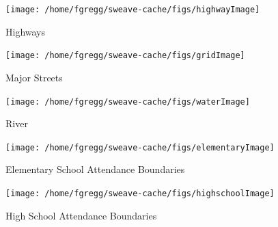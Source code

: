 \documentclass[12pt,letter]{article}\usepackage[]{graphicx}\usepackage[]{color}
\newenvironment{knitrout}{}{} %
\begin{document}
\begin{figure}
\begin{knitrout}
\color{fgcolor}

{\centering \texttt{[image: /home/fgregg/sweave-cache/figs/highwayImage]} 

}



\end{knitrout}

\caption{Highways}
\end{figure}

\begin{figure}
\begin{knitrout}
\color{fgcolor}

{\centering \texttt{[image: /home/fgregg/sweave-cache/figs/gridImage]} 

}



\end{knitrout}

\caption{Major Streets}
\end{figure}

\begin{figure}
\begin{knitrout}
\color{fgcolor}

{\centering \texttt{[image: /home/fgregg/sweave-cache/figs/waterImage]} 

}



\end{knitrout}

\caption{River}
\end{figure}

\begin{figure}
\begin{knitrout}
\color{fgcolor}

{\centering \texttt{[image: /home/fgregg/sweave-cache/figs/elementaryImage]} 

}



\end{knitrout}

\caption{Elementary School Attendance Boundaries}
\end{figure}

\begin{figure}
\begin{knitrout}
\color{fgcolor}

{\centering \texttt{[image: /home/fgregg/sweave-cache/figs/highschoolImage]} 

}



\end{knitrout}

\caption{High School Attendance Boundaries}
\end{figure}
\end{document}
